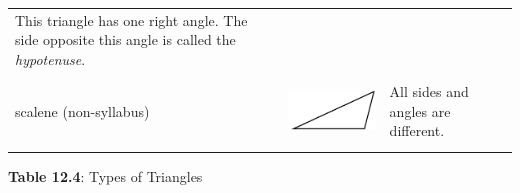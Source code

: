 \begin{center}
\begin{xtabular*}{\mytablewidth}[t]{|p{10\mystarwidth}|p{10\mystarwidth}|p{10\mystarwidth}|}
        This triangle has one right angle. The side opposite this angle is called the \textsl{hypotenuse}.%
     \tabularnewline{}
    
    
        scalene (non-syllabus) &
    
    
        
                  
    \setcounter{subfigure}{0}

\label{m39368*id317668}
    \begin{center}
    \label{m39368*id317668!!!underscore!!!media}\label{m39368*id317668!!!underscore!!!printimage}\includegraphics[width=.2\columnwidth]{col11306.imgs/m39368_MG10C13_026.png} %
        
      \vspace{2pt}
    \vspace{.1in}
    
    \end{center}



    \addtocounter{footnote}{-0}
    
                 &
    
    
        All sides and angles are different.%
     \tabularnewline{}
    \end{xtabular*}
      \end{center}
    \begin{center}{\small\bfseries Table 12.4}: Types of Triangles\end{center}
    
